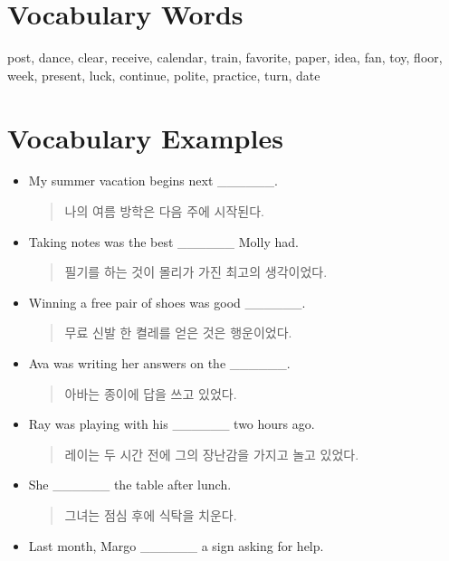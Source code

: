 \documentclass{article}
\begin{document}
\renewcommand{\familydefault}{\sfdefault}
\onehalfspacing
\fontsize{12pt}{14pt}\selectfont

\section*{Vocabulary Words}
\begin{addmargin}[1em]{1em}
post, dance, clear, receive, calendar, train, favorite, paper, idea, fan, toy, floor, week, present, luck, continue, polite, practice, turn, date
\end{addmargin}

\section*{Vocabulary Examples}
\begin{addmargin}[1em]{1em}
\begin{itemize}
    \item My summer vacation begins next \_\_\_\_\_\_.
    \begin{quote}
    나의 여름 방학은 다음 주에 시작된다.
    \end{quote}
    \item Taking notes was the best \_\_\_\_\_\_ Molly had.
    \begin{quote}
    필기를 하는 것이 몰리가 가진 최고의 생각이었다.
    \end{quote}
    \item Winning a free pair of shoes was good \_\_\_\_\_\_.
    \begin{quote}
    무료 신발 한 켤레를 얻은 것은 행운이었다.
    \end{quote}
    \item Ava was writing her answers on the \_\_\_\_\_\_.
    \begin{quote}
    아바는 종이에 답을 쓰고 있었다.
    \end{quote}
    \item Ray was playing with his \_\_\_\_\_\_ two hours ago.
    \begin{quote}
    레이는 두 시간 전에 그의 장난감을 가지고 놀고 있었다.
    \end{quote}
    \item She \_\_\_\_\_\_ the table after lunch.
    \begin{quote}
    그녀는 점심 후에 식탁을 치운다.
    \end{quote}
    \item Last month, Margo \_\_\_\_\_\_ a sign asking for help.

\end{itemize}
\end{addmargin}
\end{document}
